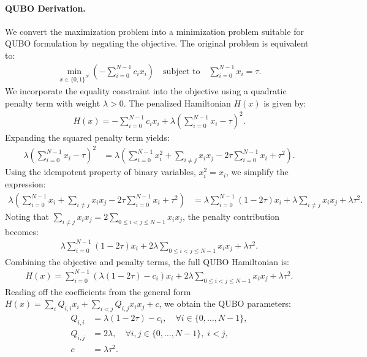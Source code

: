 \documentclass[12pt]{article}
\begin{document}
\paragraph{QUBO Derivation.}
We convert the maximization problem into a minimization problem suitable for QUBO formulation by negating the objective. The original problem is equivalent to:
\begin{align}
    \min_{x \in \{0,1\}^N} \left( -\sum_{i=0}^{N-1} c_i x_i \right)
    \quad \text{subject to} \quad
    \sum_{i=0}^{N-1} x_i = \tau.
\end{align}
We incorporate the equality constraint into the objective using a quadratic penalty term with weight $\lambda > 0$. The penalized Hamiltonian $H(x)$ is given by:
\begin{align}
    H(x) = -\sum_{i=0}^{N-1} c_i x_i + \lambda \left( \sum_{i=0}^{N-1} x_i - \tau \right)^2.
\end{align}
Expanding the squared penalty term yields:
\begin{align}
    \lambda \left( \sum_{i=0}^{N-1} x_i - \tau \right)^2
    &= \lambda \left( \sum_{i=0}^{N-1} x_i^2 + \sum_{i \neq j} x_i x_j - 2\tau \sum_{i=0}^{N-1} x_i + \tau^2 \right).
\end{align}
Using the idempotent property of binary variables, $x_i^2 = x_i$, we simplify the expression:
\begin{align}
    \lambda \left( \sum_{i=0}^{N-1} x_i + \sum_{i \neq j} x_i x_j - 2\tau \sum_{i=0}^{N-1} x_i + \tau^2 \right)
    &= \lambda \sum_{i=0}^{N-1} (1 - 2\tau) x_i + \lambda \sum_{i \neq j} x_i x_j + \lambda \tau^2.
\end{align}
Noting that $\sum_{i \neq j} x_i x_j = 2 \sum_{0 \leq i < j \leq N-1} x_i x_j$, the penalty contribution becomes:
\begin{align}
    \lambda \sum_{i=0}^{N-1} (1 - 2\tau) x_i + 2\lambda \sum_{0 \leq i < j \leq N-1} x_i x_j + \lambda \tau^2.
\end{align}
Combining the objective and penalty terms, the full QUBO Hamiltonian is:
\begin{align}
    H(x) = \sum_{i=0}^{N-1} \left( \lambda(1 - 2\tau) - c_i \right) x_i + 2\lambda \sum_{0 \leq i < j \leq N-1} x_i x_j + \lambda \tau^2.
\end{align}
Reading off the coefficients from the general form $H(x) = \sum_{i} Q_{i,i} x_i + \sum_{i < j} Q_{i,j} x_i x_j + c$, we obtain the QUBO parameters:
\begin{align}
    Q_{i,i} &= \lambda(1 - 2\tau) - c_i, \quad \forall i \in \{0, \dots, N-1\}, \\
    Q_{i,j} &= 2\lambda, \quad \forall i, j \in \{0, \dots, N-1\}, \; i < j, \\
    c &= \lambda \tau^2.
\end{align}
\end{document}
